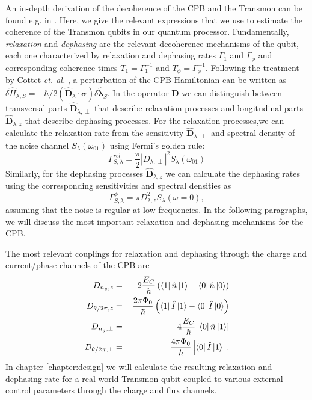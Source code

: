 An in-depth derivation of the decoherence of the CPB and the Transmon can be found e.g. in \citep{cottet_implementation_2002,koch_charge-insensitive_2007}. Here, we give the relevant expressions that we use to estimate the coherence of the Transmon qubits in our quantum processor. Fundamentally, {\it relaxation} and {\it dephasing} are the relevant decoherence mechanisms of the qubit, each one characterized by relaxation and dephasing rates $\Gamma_1$ and $\Gamma_\phi$ and corresponding coherence times $T_1=\Gamma_1^{-1}$ and $T_\phi=\Gamma_\phi^{-1}$. Following the treatment by Cottet {\it et. al.} \citep{cottet_implementation_2002}, a perturbation of the CPB Hamiltonian can be written as $\delta \hat{H}_{\lambda,S}=-\hbar/2(\mathbf{\hat{D}}_\lambda\cdot\mathbf{\sigma})\delta \mathbf{\hat{\lambda}}_S$. In the operator $\mathbf{D}$ we can distinguish between transversal parts $\hat{\mathbf{D}}_{\lambda,\perp}$ that describe relaxation processes and longitudinal parts $\hat{\mathbf{D}}_{\lambda,z}$ that describe dephasing processes. For the relaxation processes,we can calculate the relaxation rate from the sensitivity $\hat{\mathbf{D}}_{\lambda,\perp}$ and spectral density of the noise channel $S_{\lambda}(\omega_{01})$ using Fermi's golden rule:
%
\begin{equation}
\Gamma^{rel}_{S,\lambda} = \frac{\pi}{2}|D_{\lambda,\perp}|^2 S_{\lambda}(\omega_{01})
\end{equation}
%
Similarly, for the dephasing processes $\hat{\mathbf{D}}_{\lambda,z}$ we can calculate the dephasing rates using the corresponding sensitivities and spectral densities as
%
\begin{equation}
\Gamma_{S,\lambda}^\phi = \pi D_{\lambda,z}^2 S_{\lambda}(\omega = 0),
\end{equation}
%
assuming that the noise is regular at low frequencies. In the following paragraphs, we will discuss the most important relaxation and dephasing mechanisms for the CPB.

\smallskip

The most relevant couplings for relaxation and dephasing through the charge and current/phase channels of the CPB are
%
\begin{eqnarray}
D_{n_g,z} & = & -2\frac{E_C}{\hbar}\left(\left< 1 \right|\hat{n}\left| 1 \right>-\left< 0 \right|\hat{n}\left| 0 \right>\right) \\
D_{\theta/2\pi,z} & = & \frac{2\pi\Phi_0}{\hbar}\left(\left< 1 \right|\hat{I}\left| 1 \right>-\left< 0 \right|\hat{I}\left| 0 \right>\right) \\
D_{n_g,\perp} & = & 4\frac{E_C}{\hbar}\left|\left< 0 \right|\hat{n}\left| 1 \right>\right| \\
D_{\theta/2\pi,\perp} & = & \frac{4\pi\Phi_0}{\hbar}\left|\left< 0 \right|\hat{I}\left| 1 \right>\right|.
\end{eqnarray}
%
In chapter \ref{chapter:design} we will calculate the resulting relaxation and dephasing rate for a real-world Transmon qubit coupled to various external control parameters through the charge and flux channels.

